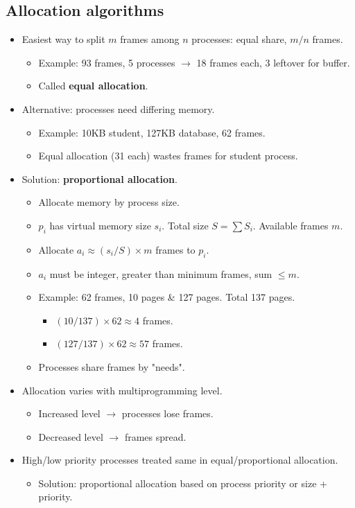 \subsection{Allocation algorithms}
\begin{itemize}
    \item Easiest way to split $m$ frames among $n$ processes: equal share, $m/n$ frames.
    \begin{itemize}
        \item Example: 93 frames, 5 processes $\rightarrow$ 18 frames each, 3 leftover for buffer.
        \item Called \textbf{equal allocation}.
    \end{itemize}
    \item Alternative: processes need differing memory.
    \begin{itemize}
        \item Example: 10KB student, 127KB database, 62 frames.
        \item Equal allocation (31 each) wastes frames for student process.
    \end{itemize}
    \item Solution: \textbf{proportional allocation}.
    \begin{itemize}
        \item Allocate memory by process size.
        \item $p_i$ has virtual memory size $s_i$. Total size $S = \sum S_i$. Available frames $m$.
        \item Allocate $a_i \approx (s_i/S) \times m$ frames to $p_i$.
        \item $a_i$ must be integer, greater than minimum frames, sum $\le m$.
        \item Example: 62 frames, 10 pages \& 127 pages. Total 137 pages.
        \begin{itemize}
            \item $(10/137) \times 62 \approx 4$ frames.
            \item $(127/137) \times 62 \approx 57$ frames.
        \end{itemize}
        \item Processes share frames by "needs".
    \end{itemize}
    \item Allocation varies with multiprogramming level.
    \begin{itemize}
        \item Increased level $\rightarrow$ processes lose frames.
        \item Decreased level $\rightarrow$ frames spread.
    \end{itemize}
    \item High/low priority processes treated same in equal/proportional allocation.
    \begin{itemize}
        \item Solution: proportional allocation based on process priority or size + priority.
    \end{itemize}
\end{itemize}

